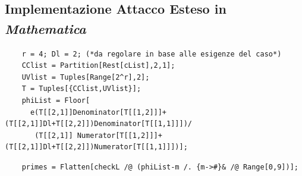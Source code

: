 \documentclass[twoside,symmetric,justified,openany,nobib]{tufte-book}
\begin{document}
\begin{tcolorbox}[enhanced, breakable, colback=white, colframe=white, check odd page, toggle left and right, grow to right by=\marginparwidth+\marginparsep, toggle enlargement=evenpage]
  \setlength{\parindent}{2ex}
  \section*{\normalfont\textbf{Implementazione Attacco Esteso in \textit{Mathematica\textsuperscript{\textregistered}}}}
  \begin{lstlisting}
    r = 4; Dl = 2; (*da regolare in base alle esigenze del caso*)
    CClist = Partition[Rest[cList],2,1];
    UVlist = Tuples[Range[2^r],2];
    T = Tuples[{CClist,UVlist}];
    phiList = Floor[
      e(T[[2,1]]Denominator[T[[1,2]]]+(T[[2,1]]Dl+T[[2,2]])Denominator[T[[1,1]]])/
       (T[[2,1]] Numerator[T[[1,2]]]+(T[[2,1]]Dl+T[[2,2]])Numerator[T[[1,1]]])];\end{lstlisting}
  \begin{lstlisting}
    primes = Flatten[checkL /@ (phiList-m /. {m->#}& /@ Range[0,9])];\end{lstlisting}

    



\end{tcolorbox}
\end{document}
